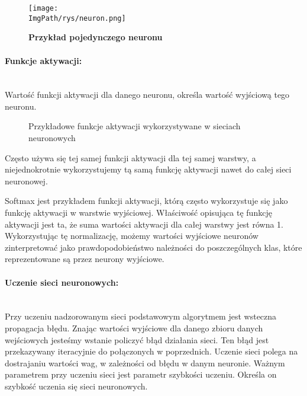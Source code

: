 \documentclass[a4paper,12pt,twoside,openany]{report}
\newcommand{\ImgPath}{.}
\begin{document}
\begin{figure}[H]	
	\centering
	\texttt{[image: \\ImgPath/rys/neuron.png]}
	
	\caption{  \textbf{Przykład pojedynczego neuronu}}
\end{figure}

\paragraph{Funkcje aktywacji:}
\mbox{} \\
Wartość funkcji aktywacji dla danego neuronu, określa wartość wyjściową tego neuronu.
\begin{figure}[H]
	\centering
	\caption{Przykładowe funkcje aktywacji wykorzystywane w sieciach neuronowych}
\end{figure}

Często używa się tej samej funkcji aktywacji dla tej samej warstwy, a niejednokrotnie wykorzystujemy tą samą funkcję aktywacji nawet do całej sieci neuronowej. 

Softmax jest przykładem funkcji aktywacji, którą często wykorzystuje się jako funkcję aktywacji w warstwie wyjściowej. Właściwość opisująca tę funkcję aktywacji jest ta, że suma wartości aktywacji dla całej warstwy jest równa 1. Wykorzystując tę normalizację, możemy wartości wyjściowe neuronów zinterpretować jako prawdopodobieństwo należności do poszczególnych klas, które reprezentowane są przez neurony wyjściowe.  

\paragraph{Uczenie sieci neuronowych:}
\mbox{} \\
\indent
Przy uczeniu nadzorowanym sieci podstawowym algorytmem jest wsteczna propagacja błędu. Znając wartości wyjściowe dla danego zbioru danych wejściowych jesteśmy wstanie policzyć błąd działania sieci. Ten błąd jest przekazywany iteracyjnie do połączonych w poprzednich. Uczenie sieci polega na dostrajaniu wartości wag, w zależności od błędu w danym neuronie. Ważnym parametrem przy uczeniu sieci jest parametr szybkości uczeniu. Określa on szybkość uczenia się sieci neuronowych. 
\end{document}

